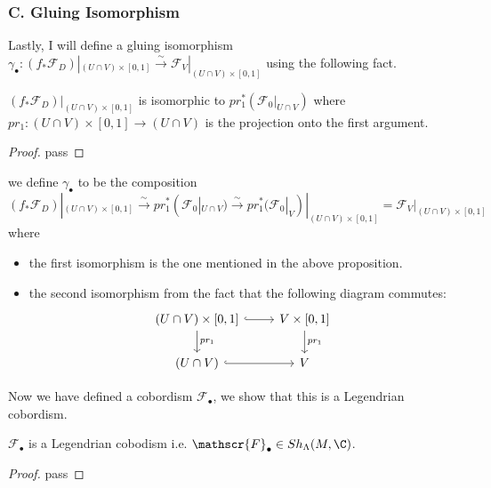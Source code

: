 \subsubsection{C. Gluing Isomorphism}
Lastly, I will define a gluing isomorphism $\gamma_\bullet : (f_*\mathscr{F}_D)|_{(U\cap V)\times [0,1]} \xrightarrow{\sim} \mathscr{F}_V|_{(U\cap V)\times [0,1]}$ using the following fact.
\begin{proposition}
$(f_*\mathscr{F}_D)|_{(U\cap V)\times[0,1]}$ is isomorphic to $pr_1^*(\mathscr{F}_0|_{U\cap V})$ where $pr_1 : (U\cap V) \times [0,1] \rightarrow (U\cap V)$ is the projection onto the first argument.
\end{proposition}
\begin{proof}
pass
\end{proof}
\begin{definition}
we define $\gamma_\bullet$ to be the composition 
\[
(f_*\mathscr{F}_D)|_{(U\cap V)\times [0,1]}\xrightarrow{\sim}pr_1^*(\mathscr{F}_0|_{U\cap V})\xrightarrow{\sim}pr_1^*(\mathscr{F}_0|_{V})|_{(U\cap V)\times [0,1]}=\mathscr{F}_V|_{(U\cap V)\times [0,1]}
\]
where
\begin{itemize}
\item the first isomorphism is the one mentioned in the above proposition.

\item the second isomorphism from the fact that the following diagram commutes:
\[
\begin{tikzcd}
(U\cap V)\times [0,1] \arrow[hookrightarrow]{r}\arrow[d, "pr_1"]     & V\times [0,1] \arrow[d, "pr_1"] \\
(U\cap V) \arrow[hookrightarrow]{r} & V 
\end{tikzcd}
\]
\end{itemize}
\end{definition}

Now we have defined a cobordism $\mathscr{F}_\bullet$, we show that this is a Legendrian cobordism.
\begin{proposition}
$\mathscr{F}_\bullet$ is a Legendrian cobodism i.e. $\mathscr{F}_\bullet \in Sh_\Lambda(M,\C)$.
\end{proposition}
\begin{proof}
pass
\end{proof}
